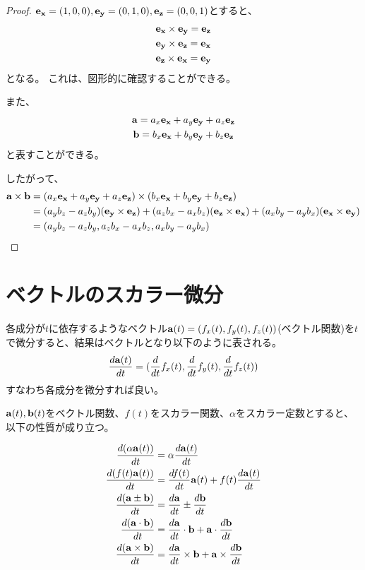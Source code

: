 \documentclass{ltjsreport}
\begin{document}
\begin{proof}
    $\vb{e_x}=(1,0,0),\vb{e_y}=(0,1,0),\vb{e_z}=(0,0,1)$とすると、
    \begin{gather}
        \vb{e_x}\times\vb{e_y}=\vb{e_z} \\
        \vb{e_y}\times\vb{e_z}=\vb{e_x} \\
        \vb{e_z}\times\vb{e_x}=\vb{e_y}
    \end{gather}
    となる。
    これは、図形的に確認することができる。

    また、
    \begin{gather}
        \vb{a} = a_x\vb{e_x}+a_y\vb{e_y}+a_z\vb{e_z} \\
        \vb{b} = b_x\vb{e_x}+b_y\vb{e_y}+b_z\vb{e_z}
    \end{gather}
    と表すことができる。

    したがって、
    \begin{align}
        \vb{a}\times\vb{b} &= (a_x\vb{e_x}+a_y\vb{e_y}+a_z\vb{e_z})\times(b_x\vb{e_x}+b_y\vb{e_y}+b_z\vb{e_z}) \\
                           &= (a_yb_z-a_zb_y)(\vb{e_y}\times\vb{e_z})+(a_zb_x-a_xb_z)(\vb{e_z}\times\vb{e_x})+(a_xb_y-a_yb_x)(\vb{e_x}\times\vb{e_y}) \\
                           &= (a_yb_z-a_zb_y,a_zb_x-a_xb_z,a_xb_y-a_yb_x)
    \end{align}
\end{proof}

\section{ベクトルのスカラー微分}

各成分が$t$に依存するようなベクトル$\vb{a}(t)=(f_x(t),f_y(t),f_z(t))$(ベクトル関数)を$t$で微分すると、結果はベクトルとなり以下のように表される。
\begin{equation}
    \frac{d\vb{a}(t)}{dt} = (\frac{d}{dt}f_x(t),\frac{d}{dt}f_y(t),\frac{d}{dt}f_z(t))
\end{equation}
すなわち各成分を微分すれば良い。

$\vb{a}(t),\vb{b}(t)$をベクトル関数、$f(t)$をスカラー関数、$\alpha$をスカラー定数とすると、以下の性質が成り立つ。

\begin{align}
    \frac{d(\alpha\vb{a}(t))}{dt}    &= \alpha\frac{d\vb{a}(t)}{dt} \\
    \frac{d(f(t)\vb{a}(t))}{dt}      &= \frac{df(t)}{dt}\vb{a}(t) + f(t)\frac{d\vb{a}(t)}{dt} \\
    \frac{d(\vb{a}\pm\vb{b})}{dt}    &= \frac{d\vb{a}}{dt}\pm\frac{d\vb{b}}{dt} \\
    \frac{d(\vb{a}\cdot\vb{b})}{dt}  &= \frac{d\vb{a}}{dt}\cdot\vb{b} + \vb{a}\cdot\frac{d\vb{b}}{dt} \\
    \frac{d(\vb{a}\times\vb{b})}{dt} &= \frac{d\vb{a}}{dt}\times\vb{b} + \vb{a}\times\frac{d\vb{b}}{dt}
\end{align}
\end{document}
